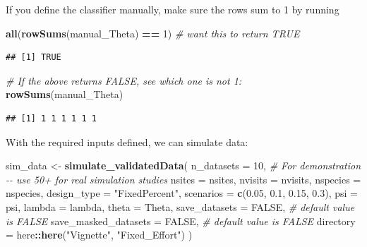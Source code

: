 \documentclass[
]{article}
\newenvironment{Shaded}{\begin{snugshade}}{\end{snugshade}}
\newcommand{\AttributeTok}[1]{\textcolor[rgb]{0.13,0.29,0.53}{#1}}
\newcommand{\CommentTok}[1]{\textcolor[rgb]{0.56,0.35,0.01}{\textit{#1}}}
\newcommand{\ConstantTok}[1]{\textcolor[rgb]{0.56,0.35,0.01}{#1}}
\newcommand{\DecValTok}[1]{\textcolor[rgb]{0.00,0.00,0.81}{#1}}
\newcommand{\FloatTok}[1]{\textcolor[rgb]{0.00,0.00,0.81}{#1}}
\newcommand{\FunctionTok}[1]{\textcolor[rgb]{0.13,0.29,0.53}{\textbf{#1}}}
\newcommand{\NormalTok}[1]{#1}
\newcommand{\OtherTok}[1]{\textcolor[rgb]{0.56,0.35,0.01}{#1}}
\newcommand{\SpecialCharTok}[1]{\textcolor[rgb]{0.81,0.36,0.00}{\textbf{#1}}}
\newcommand{\StringTok}[1]{\textcolor[rgb]{0.31,0.60,0.02}{#1}}
\begin{document}
\linespread{1}

If you define the classifier manually, make sure the rows sum to 1 by running

\linespread{1}

\begin{Shaded}
\begin{Highlighting}[]
\FunctionTok{all}\NormalTok{(}\FunctionTok{rowSums}\NormalTok{(manual\_Theta) }\SpecialCharTok{==} \DecValTok{1}\NormalTok{) }\CommentTok{\# want this to return TRUE}
\end{Highlighting}
\end{Shaded}

\begin{verbatim}
## [1] TRUE
\end{verbatim}

\begin{Shaded}
\begin{Highlighting}[]
\CommentTok{\# If the above returns FALSE, see which one is not 1: }
\FunctionTok{rowSums}\NormalTok{(manual\_Theta)}
\end{Highlighting}
\end{Shaded}

\begin{verbatim}
## [1] 1 1 1 1 1 1
\end{verbatim}

\linespread{1}

With the required inputs defined, we can simulate data:

\linespread{1}

\begin{Shaded}
\begin{Highlighting}[]
\NormalTok{sim\_data }\OtherTok{\textless{}{-}} \FunctionTok{simulate\_validatedData}\NormalTok{(}
    \AttributeTok{n\_datasets =} \DecValTok{10}\NormalTok{, }\CommentTok{\# For demonstration {-}{-} use 50+ for real simulation studies}
    \AttributeTok{nsites =}\NormalTok{ nsites, }
    \AttributeTok{nvisits =}\NormalTok{ nvisits, }
    \AttributeTok{nspecies =}\NormalTok{ nspecies, }
    \AttributeTok{design\_type =} \StringTok{"FixedPercent"}\NormalTok{, }
    \AttributeTok{scenarios =} \FunctionTok{c}\NormalTok{(}\FloatTok{0.05}\NormalTok{, }\FloatTok{0.1}\NormalTok{, }\FloatTok{0.15}\NormalTok{, }\FloatTok{0.3}\NormalTok{),}
    \AttributeTok{psi =}\NormalTok{ psi, }
    \AttributeTok{lambda =}\NormalTok{ lambda,}
    \AttributeTok{theta =}\NormalTok{ Theta, }
    \AttributeTok{save\_datasets =} \ConstantTok{FALSE}\NormalTok{, }\CommentTok{\# default value is FALSE}
    \AttributeTok{save\_masked\_datasets =} \ConstantTok{FALSE}\NormalTok{, }\CommentTok{\# default value is FALSE}
    \AttributeTok{directory =}\NormalTok{ here}\SpecialCharTok{::}\FunctionTok{here}\NormalTok{(}\StringTok{"Vignette"}\NormalTok{, }\StringTok{"Fixed\_Effort"}\NormalTok{)}
\NormalTok{)}
\end{Highlighting}
\end{Shaded}
\end{document}
